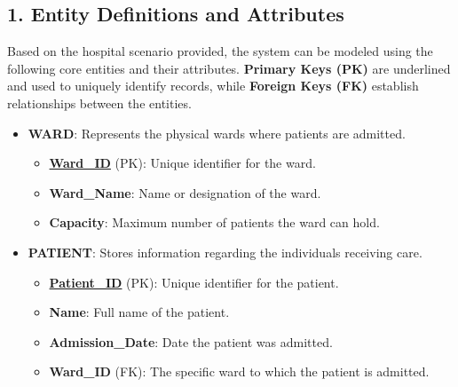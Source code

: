 \documentclass[12pt,a3paper]{article}
\begin{document}
\begin{enumerate}
\begin{tcolorbox}[enhanced,breakable,ansbox,colback=cA!4,colframe=cA,boxrule=0.8pt,arc=5pt,title={\textbf{Answer}},fonttitle=\bfseries\color{white},colbacktitle=cA]

\subsection*{1. Entity Definitions and Attributes}

Based on the hospital scenario provided, the system can be modeled using the following core entities and their attributes. \textbf{Primary Keys (PK)} are underlined and used to uniquely identify records, while \textbf{Foreign Keys (FK)} establish relationships between the entities.

\begin{itemize}[leftmargin=2em, itemsep=1em]
    \item \textbf{WARD}: Represents the physical wards where patients are admitted.
    \begin{itemize}[label={--}, itemsep=2pt]
        \item \underline{\textbf{Ward\_ID}} (PK): Unique identifier for the ward.
        \item \textbf{Ward\_Name}: Name or designation of the ward.
        \item \textbf{Capacity}: Maximum number of patients the ward can hold.
    \end{itemize}

    \item \textbf{PATIENT}: Stores information regarding the individuals receiving care.
    \begin{itemize}[label={--}, itemsep=2pt]
        \item \underline{\textbf{Patient\_ID}} (PK): Unique identifier for the patient.
        \item \textbf{Name}: Full name of the patient.
        \item \textbf{Admission\_Date}: Date the patient was admitted.
        \item \textbf{Ward\_ID} (FK): The specific ward to which the patient is admitted.
    \end{itemize}


\end{itemize}
\end{tcolorbox}
\end{enumerate}
\end{document}

